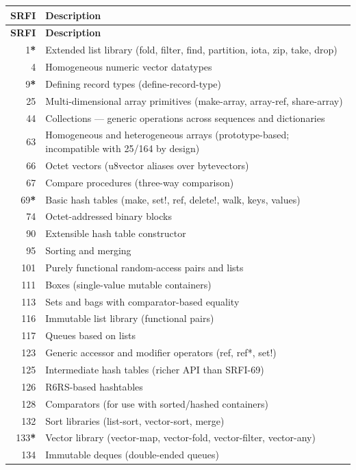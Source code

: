 \begin{longtable}{rp{9cm}}
\textbf{SRFI} & \textbf{Description} \\
\hline
\endfirsthead
\textbf{SRFI} & \textbf{Description} \\
\hline
\endhead
1\textbf{*} & Extended list library (fold, filter, find, partition, iota, zip, take, drop) \\
4 & Homogeneous numeric vector datatypes \\
9\textbf{*} & Defining record types (define-record-type) \\
25 & Multi-dimensional array primitives (make-array, array-ref, share-array) \\
44 & Collections --- generic operations across sequences and dictionaries \\
63 & Homogeneous and heterogeneous arrays (prototype-based; incompatible with 25/164 by design) \\
66 & Octet vectors (u8vector aliases over bytevectors) \\
67 & Compare procedures (three-way comparison) \\
69\textbf{*} & Basic hash tables (make, set!, ref, delete!, walk, keys, values) \\
74 & Octet-addressed binary blocks \\
90 & Extensible hash table constructor \\
95 & Sorting and merging \\
101 & Purely functional random-access pairs and lists \\
111 & Boxes (single-value mutable containers) \\
113 & Sets and bags with comparator-based equality \\
116 & Immutable list library (functional pairs) \\
117 & Queues based on lists \\
123 & Generic accessor and modifier operators (ref, ref*, set!) \\
125 & Intermediate hash tables (richer API than SRFI-69) \\
126 & R6RS-based hashtables \\
128 & Comparators (for use with sorted/hashed containers) \\
132 & Sort libraries (list-sort, vector-sort, merge) \\
133\textbf{*} & Vector library (vector-map, vector-fold, vector-filter, vector-any) \\
134 & Immutable deques (double-ended queues) \\

\end{longtable}
